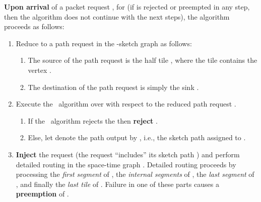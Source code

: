 \documentclass[11pt]{article}
\newcommand{\route}{\text{\sc{ipp}}}
\newcommand{\IPP}{\route}
\newenvironment{proof sketch}[1]{\noindent {\emph{Proof sketch of #1:}}}{\hfill \qed}
\begin{document}
\begin{algorithm}[H]
    \textbf{Upon arrival} of a packet request , for  (if  is rejected or preempted in any step, then the algorithm does not continue with the next steps), the algorithm proceeds as follows:
        \begin{enumerate}
            \item \label{item:reduce}Reduce  to a path request  in the -sketch graph  as follows:
                \begin{enumerate}
                  \item The source of the path request  is the half  tile , where the tile  contains the vertex .
                  \item The destination of the path request  is simply the sink .
                \end{enumerate}
            \item Execute the \IPP\ algorithm over  with respect to the reduced path request .
             \begin{enumerate}
               \item If the \IPP\ algorithm rejects the  then \textbf{reject} .
               \item Else, let  denote the path output by \IPP, i.e., the sketch path assigned to .
             \end{enumerate}
            \item \label{item:I} \textbf{Inject} the request  (the request ``includes'' its sketch path  ) and perform detailed routing in the space-time graph .
                Detailed routing proceeds by processing the \emph{first segment} of , the \emph{internal segments} of , the \emph{last segment} of , and finally the \emph{last tile} of .
                Failure in one of these parts causes a \textbf{preemption} of .
\begin{comment}
                  \begin{enumerate}
                  \item Perform detailed routing in the \emph{first segment} of . If the detailed routing in this segment fails then \textbf{preempt} .
                  \item Perform detailed routing in the \emph{internal segments} of  (this part of detailed routing always succeeds).
                  \item Perform detailed routing in the \emph{last segment} of . If the detailed routing in this segment fails then \textbf{preempt} .
                  \item Perform detailed routing in the \emph{last tile} of . If the detailed routing in this segment fails then \textbf{preempt} .

\end{comment}
\end{enumerate}
\end{algorithm}
\end{document}
